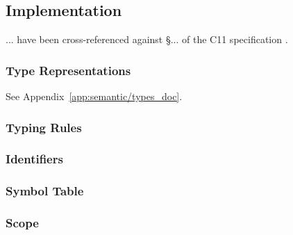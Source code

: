 \subsection{Implementation}
... have been cross-referenced against §... of the C11 specification \cite{c11_spec}.

\subsubsection{Type Representations}

See Appendix~\ref{app:semantic/types_doc}.

\subsubsection{Typing Rules}

\subsubsection{Identifiers}

\subsubsection{Symbol Table}

\subsubsection{Scope}
